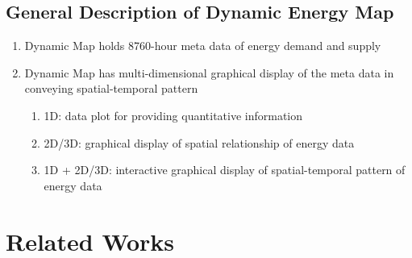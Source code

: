\documentclass[12pt]{article}
\begin{document}
\subsection{General Description of Dynamic Energy Map}
\begin{enumerate}[label*=\arabic*.]
\item Dynamic Map holds 8760-hour meta data of energy demand
    and supply
\item Dynamic Map has multi-dimensional graphical display of the
    meta data in conveying spatial-temporal pattern
    \begin{enumerate}[label*=\arabic*.]
    \item 1D: data plot for providing quantitative information
    \item 2D/3D: graphical display of spatial relationship of energy 
    data
    \item 1D + 2D/3D: interactive graphical display of
    spatial-temporal pattern of energy data
    \end{enumerate}
\end{enumerate}

\newpage
\section{Related Works}
\end{document}
